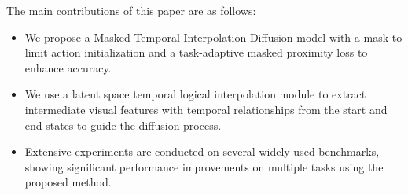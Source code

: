 The main contributions of this paper are as follows:
\begin{itemize}[leftmargin=*]
    \item We propose a Masked Temporal Interpolation Diffusion model with a mask to limit action initialization and a task-adaptive masked proximity loss to enhance accuracy.
    
    \item We use a latent space temporal logical interpolation module to extract intermediate visual features with temporal relationships from the start and end states to guide the diffusion process.
    
    \item Extensive experiments are conducted on several widely used benchmarks, showing significant performance improvements on multiple tasks using the proposed method.
\end{itemize}





